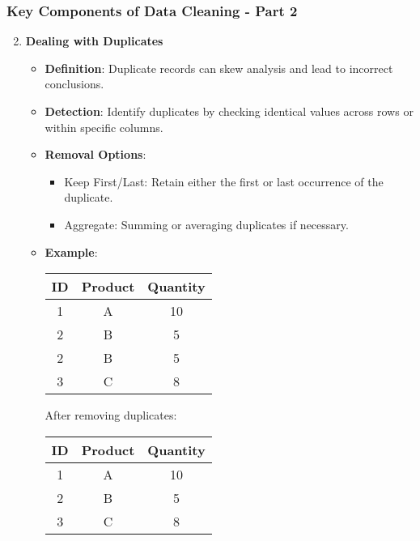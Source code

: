 \documentclass[aspectratio=169]{beamer}
\begin{document}
\begin{frame}[fragile]
    \frametitle{Key Components of Data Cleaning - Part 2}
    \begin{enumerate}
        \setcounter{enumi}{1} %
        \item \textbf{Dealing with Duplicates}
        \begin{itemize}
            \item \textbf{Definition}: Duplicate records can skew analysis and lead to incorrect conclusions.
            \item \textbf{Detection}: Identify duplicates by checking identical values across rows or within specific columns.
            \item \textbf{Removal Options}:
            \begin{itemize}
                \item Keep First/Last: Retain either the first or last occurrence of the duplicate.
                \item Aggregate: Summing or averaging duplicates if necessary.
            \end{itemize}
            \item \textbf{Example}:
                \begin{center}
                \begin{tabular}{|c|c|c|}
                    \hline
                    ID & Product & Quantity \\
                    \hline
                    1  & A       & 10 \\
                    2  & B       & 5  \\
                    2  & B       & 5  \\
                    3  & C       & 8  \\
                    \hline
                \end{tabular}
                \end{center}
                After removing duplicates:
                \begin{center}
                \begin{tabular}{|c|c|c|}
                    \hline
                    ID & Product & Quantity \\
                    \hline
                    1  & A       & 10 \\
                    2  & B       & 5  \\
                    3  & C       & 8  \\
                    \hline
                \end{tabular}
                \end{center}
        \end{itemize}
    \end{enumerate}
\end{frame}
\end{document}
